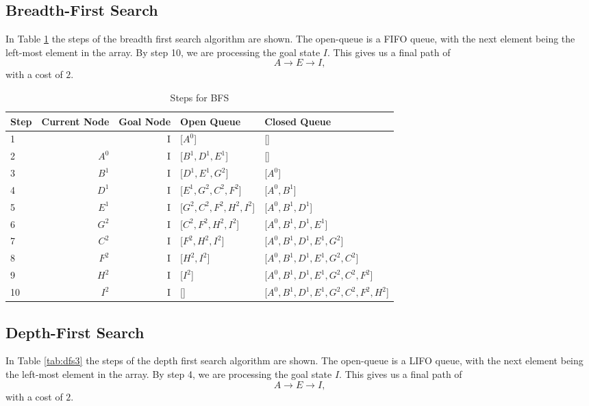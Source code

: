 \documentclass{article}
\begin{document}
\subsection{Breadth-First Search}
    In Table \ref{tab:bfs3} the steps of the breadth first search algorithm are shown. The open-queue is a FIFO queue, with the next element being the left-most element in the array.
    By step 10, we are processing the goal state $I$. This gives us a final path of
    \begin{equation}
        A \rightarrow E \rightarrow I,
    \end{equation}
    with a cost of $2$.
    \begin{table}[!htp]\centering
        \caption{Steps for BFS}\label{tab:bfs3}
        \scriptsize
        \begin{tabular}{lrrll}\toprule
        Step &Current Node &Goal Node & Open Queue &Closed Queue  \\\midrule
        1&  &I &[$A^0$] &[] \\
        2& $A^0$ &I &[$B^1, D^1, E^1$] &[] \\
        3& $B^1$ &I &[$D^1, E^1, G^2$] &[$A^0$] \\
        4& $D^1$ &I &[$E^1, G^2, C^2, F^2$] &[$A^0, B^1$] \\
        5& $E^1$ &I &[$G^2, C^2, F^2, H^2, I^2$] &[$A^0, B^1, D^1$] \\
        6& $G^2$ &I &[$C^2, F^2, H^2, I^2$] &[$A^0, B^1, D^1, E^1$] \\
        7& $C^2$ &I &[$F^2, H^2, I^2$] &[$A^0, B^1, D^1, E^1, G^2$] \\
        8& $F^2$ &I &[$H^2, I^2$] & [$A^0, B^1, D^1, E^1, G^2, C^2$]\\
        9& $H^2$ &I &[$I^2$] & [$A^0, B^1, D^1, E^1, G^2, C^2, F^2$]\\
        10& $I^2$ &I &[] & [$A^0, B^1, D^1, E^1, G^2, C^2, F^2, H^2$]\\
        \bottomrule
        \end{tabular}
    \end{table}

\subsection{Depth-First Search}
    In Table \ref{tab:dfs3} the steps of the depth first search algorithm are shown. The open-queue is a LIFO queue, with the next element being the left-most element in the array. 
    By step 4, we are processing the goal state $I$. This gives us a final path of
    \begin{equation}
        A \rightarrow E \rightarrow I,
    \end{equation}
    with a cost of $2$.
\end{document}
